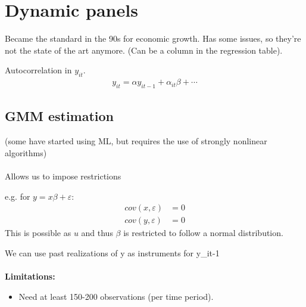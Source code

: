 \section{Dynamic panels} %
\begin{multicols}{2}
Became the standard in the 90s for economic growth. Has some issues, so they're not the state of the art anymore. (Can be a column in the regression table).

Autocorrelation in $y_{it}$.
\begin{align*}
  y_{it} = \alpha y_{it-1}+\alpha_{it}\beta+\cdots
\end{align*}

\subsection{GMM estimation}
(some have started using ML, but requires the use of strongly nonlinear algorithms)
\\ \\
Allows us to impose restrictions\par
e.g. for $y=x\beta+\varepsilon$:
\begin{align*}
  cov(x,\varepsilon)&=0  \\
  cov(y,\varepsilon)&=0
\end{align*}
This is possible as $u$ and thus $\beta$ is restricted to follow a normal distribution.

We can use past realizations of y as instruments for y_{it-1}
\\ \\
\textbf{Limitations:}
\begin{itemize}
  \item Need at least 150-200 observations (per time period).
\end{itemize}


\end{multicols}



